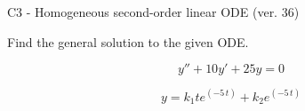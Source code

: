 \begin{exercise}
  \begin{exerciseTitle}C3 - Homogeneous second-order linear ODE (ver. 36)\end{exerciseTitle}
  \begin{exerciseStatement}
    
Find the general solution to the given ODE.

    
\[y''+10y'+25y = 0\]

  \end{exerciseStatement}
  \begin{exerciseAnswer}
    
\[y= k_{1} t e^{\left(-5 \, t\right)} + k_{2} e^{\left(-5 \, t\right)}\]

  \end{exerciseAnswer}
\end{exercise}